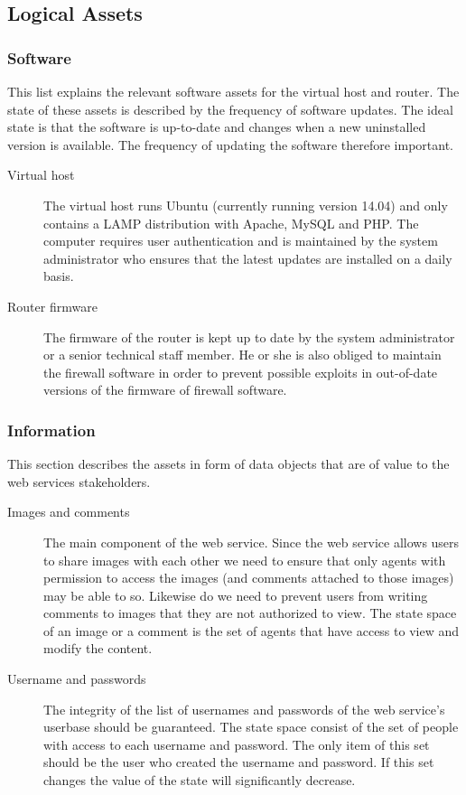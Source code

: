 \documentclass{article}
\begin{document}
\subsection*{Logical Assets}

\subsubsection*{Software}
This list explains the relevant software assets for the virtual host and router. 
The state of these assets is described by the frequency of software updates. 
The ideal state is that the software is up-to-date and changes when a new uninstalled version is available. 
The frequency of updating the software therefore important. 

\begin{description}
	\item[Virtual host]
	The virtual host runs Ubuntu (currently running version 14.04) and only contains a LAMP distribution with Apache, MySQL and PHP. 
	The computer requires user authentication and is maintained by the system administrator 
	who ensures that the latest updates are installed on a daily basis. 
	\item[Router firmware]
	The firmware of the router is kept up to date by the system administrator or a senior technical staff member. 
	He or she is also obliged to maintain the firewall software in order to prevent possible exploits 
	in out-of-date versions of the firmware of firewall software. 

\end{description}

\subsubsection*{Information}
This section describes the assets in form of data objects that are of value to the web services stakeholders.


\begin{description}
	\item[Images and comments] 
	The main component of the web service. 
	Since the web service allows users to share images with each other we need to ensure that only agents 
	with permission to access the images (and comments attached to those images) may be able to so. 
	Likewise do we need to prevent users from writing comments to images that they are not authorized to view. 
	The state space of an image or a comment is the set of agents that have access to view and modify the content. 
	
	\item[Username and passwords] 
	The integrity of the list of usernames and passwords of the web service's userbase should be guaranteed. 
	The state space consist of the set of people with access to each username and password. 
	The only item of this set should be the user who created the username and password. 
	If this set changes the value of the state will significantly decrease.
\end{description}
\end{document}
